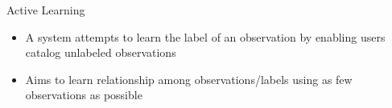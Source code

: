 \begin{frame}{Active Learning}
    \begin{itemize}
        \item A system attempts to learn the label of an observation by enabling users catalog unlabeled observations \cite{report:active-learning}
        \item Aims to learn relationship among observations/labels using as few observations as possible
    \end{itemize}
\end{frame}

